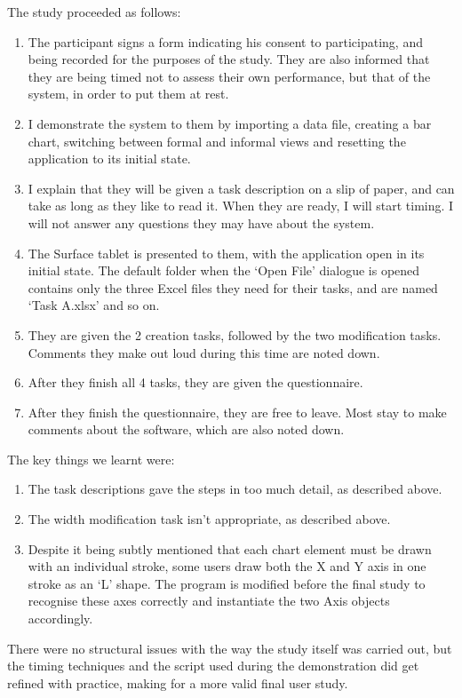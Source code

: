 The study proceeded as follows:
\begin{enumerate}
\item The participant signs a form indicating his consent to participating, and being recorded for the purposes of the study. They are also informed that they are being timed not to assess their own performance, but that of the system, in order to put them at rest.
\item I demonstrate the system to them by importing a data file, creating a bar chart, switching between formal and informal views and resetting the application to its initial state.
\item I explain that they will be given a task description on a slip of paper, and can take as long as they like to read it. When they are ready, I will start timing. I will not answer any questions they may have about the system.
\item The Surface tablet is presented to them, with the application open in its initial state. The default folder when the `Open File' dialogue is opened contains only the three Excel files they need for their tasks, and are named `Task A.xlsx' and so on.
\item They are given the 2 creation tasks, followed by the two modification tasks. Comments they make out loud during this time are noted down. 
\item After they finish all 4 tasks, they are given the questionnaire.
\item After they finish the questionnaire, they are free to leave. Most stay to make comments about the software, which are also noted down.
\end{enumerate}

The key things we learnt were:
\begin{enumerate}
\item The task descriptions gave the steps in too much detail, as described above.
\item The width modification task isn't appropriate, as described above.
\item Despite it being subtly mentioned that each chart element must be drawn with an individual stroke, some users draw both the X and Y axis in one stroke as an `L' shape. The program is modified before the final study to recognise these axes correctly and instantiate the two Axis objects accordingly. 
\end{enumerate}

There were no structural issues with the way the study itself was carried out, but the timing techniques and the script used during the demonstration did get refined with practice, making for a more valid final user study.

